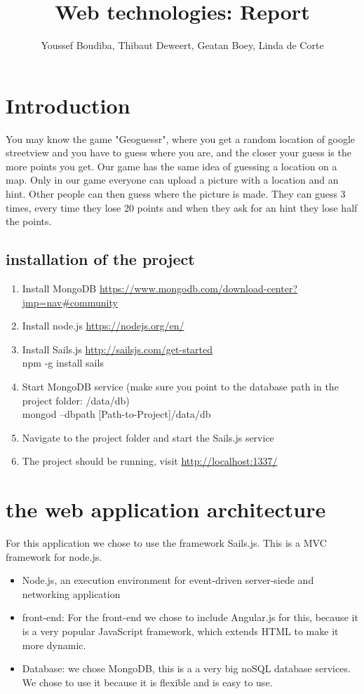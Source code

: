 \documentclass[11pt, oneside]{article}   	%
\title{Web technologies: Report}
\author{Youssef Boudiba, Thibaut Deweert, Geatan Boey, Linda de Corte }
\date{}							%
\begin{document}
\maketitle
\clearpage

\tableofcontents
\clearpage


\section{Introduction}
You may know the game "Geoguessr", where you get a random location of google streetview and you have to guess where you are, and the closer your guess is the more points you get. 
Our game has the same idea of guessing a location on a map. Only in our game everyone can upload a picture with a location and an hint. Other people can then guess where the picture is made. They can guess 3 times, every time they lose 20 points and when they ask for an hint they lose half the points.

\subsection{installation of the project}
\begin{enumerate}
\item Install MongoDB \url{https://www.mongodb.com/download-center?jmp=nav#community} 
\item  Install node.js \url{https://nodejs.org/en/}
\item Install Sails.js \url{http://sailsjs.com/get-started} \\
 npm -g install sails 
\item Start MongoDB service (make sure you point to the database path in the project folder: /data/db) \\ 
mongod --dbpath [Path-to-Project]/data/db
\item Navigate to the project folder and start the Sails.js service
\item The project should be running, visit \url{http://localhost:1337/ }

\end{enumerate}

\section{ the web application architecture}
For this application we chose to use the framework Sails.js. This is a  MVC framework for node.js. 

\begin{itemize}
\item Node.js, an execution environment for event-driven server-siede and networking application
\item front-end: For the front-end we chose to include Angular.js for this, because it is a very popular JavaScript framework, which extends HTML to make it more dynamic.
\item Database:  we chose MongoDB, this is a a very big noSQL database services. We chose to use it because it is flexible and is easy to use.
\end{itemize}
\end{document}
